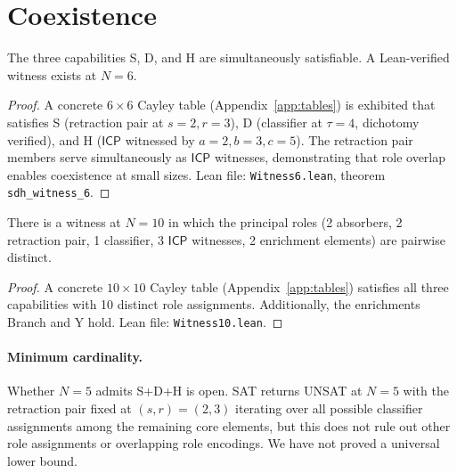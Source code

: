 \documentclass[sigconf,screen,review,anonymous]{acmart}
\newcommand{\ICP}{\textsf{ICP}}
\begin{document}
\section{Coexistence}
\label{sec:bound}

\begin{theorem}
\label{thm:bound}
The three capabilities S, D, and H are simultaneously satisfiable. A Lean-verified witness exists at $N\!=\!6$.
\end{theorem}

\begin{proof}
A concrete $6 \times 6$ Cayley table (Appendix~\ref{app:tables}) is exhibited that satisfies S (retraction pair at $s\!=\!2, r\!=\!3$), D (classifier at $\tau\!=\!4$, dichotomy verified), and H ($\ICP$ witnessed by $a\!=\!2, b\!=\!3, c\!=\!5$). The retraction pair members serve simultaneously as $\ICP$ witnesses, demonstrating that role overlap enables coexistence at small sizes. Lean file: \texttt{Witness6.lean}, theorem \texttt{sdh\_witness\_6}.
\end{proof}

\begin{proposition}
\label{thm:separated}
There is a witness at $N\!=\!10$ in which the principal roles (2 absorbers, 2 retraction pair, 1 classifier, 3 $\ICP$ witnesses, 2 enrichment elements) are pairwise distinct.
\end{proposition}

\begin{proof}
A concrete $10 \times 10$ Cayley table (Appendix~\ref{app:tables}) satisfies all three capabilities with 10 distinct role assignments. Additionally, the enrichments Branch and Y hold. Lean file: \texttt{Witness10.lean}.
\end{proof}

\paragraph{Minimum cardinality.}
Whether $N\!=\!5$ admits S+D+H is open. SAT returns UNSAT at $N\!=\!5$ with the retraction pair fixed at $(s, r) = (2, 3)$ iterating over all possible classifier assignments among the remaining core elements, but this does not rule out other role assignments or overlapping role encodings. We have not proved a universal lower bound.

\end{document}
